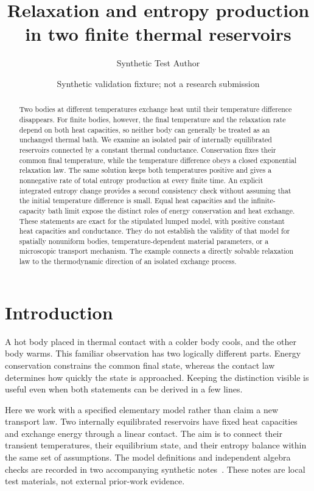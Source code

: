 \documentclass[aps,prx,reprint,groupedaddress]{revtex4-2}
\begin{document}
\title{Relaxation and entropy production in two finite thermal reservoirs}
\author{Synthetic Test Author}
\noaffiliation
\date{Synthetic validation fixture; not a research submission}
\begin{abstract}
Two bodies at different temperatures exchange heat until their temperature difference disappears. For finite bodies, however, the final temperature and the relaxation rate depend on both heat capacities, so neither body can generally be treated as an unchanged thermal bath. We examine an isolated pair of internally equilibrated reservoirs connected by a constant thermal conductance. Conservation fixes their common final temperature, while the temperature difference obeys a closed exponential relaxation law. The same solution keeps both temperatures positive and gives a nonnegative rate of total entropy production at every finite time. An explicit integrated entropy change provides a second consistency check without assuming that the initial temperature difference is small. Equal heat capacities and the infinite-capacity bath limit expose the distinct roles of energy conservation and heat exchange. These statements are exact for the stipulated lumped model, with positive constant heat capacities and conductance. They do not establish the validity of that model for spatially nonuniform bodies, temperature-dependent material parameters, or a microscopic transport mechanism. The example connects a directly solvable relaxation law to the thermodynamic direction of an isolated exchange process.
\end{abstract}
\maketitle

\section{Introduction}
A hot body placed in thermal contact with a colder body cools, and the other body warms. This familiar observation has two logically different parts. Energy conservation constrains the common final state, whereas the contact law determines how quickly the state is approached. Keeping the distinction visible is useful even when both statements can be derived in a few lines.

Here we work with a specified elementary model rather than claim a new transport law. Two internally equilibrated reservoirs have fixed heat capacities and exchange energy through a linear contact. The aim is to connect their transient temperatures, their equilibrium state, and their entropy balance within the same set of assumptions. The model definitions and independent algebra checks are recorded in two accompanying synthetic notes~\cite{fixturemodel,fixturealgebra}. These notes are local test materials, not external prior-work evidence.
\end{document}
